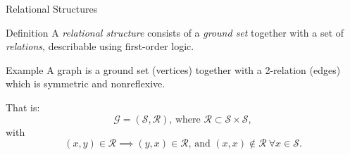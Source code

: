 \documentclass[xcolor=table,dvipsnames]{beamer}
\begin{document}
  \begin{frame}{Relational Structures}

    \begin{block}{Definition}
      A \emph{relational structure} consists of a \emph{ground set} together with
      a set of \emph{relations}, describable using first-order logic. 
    \end{block}
    \pause
    \begin{block}{Example}
      A graph is a ground set (vertices) together with a 2-relation (edges) which
      is symmetric and nonreflexive. 

      That is:
      $$ \mathcal{G} = (\mathcal{S}, \mathcal{R}) \text{, where }
      \mathcal{R} \subset \mathcal{S} \times \mathcal{S},$$
      with 
      $$ (x,y) \in \mathcal{R} \implies (y,x) \in \mathcal{R} \text{, and }
       (x,x) \notin \mathcal{R}\ \forall x \in \mathcal{S}.$$


    \end{block}

  \end{frame}
    
\end{document}
